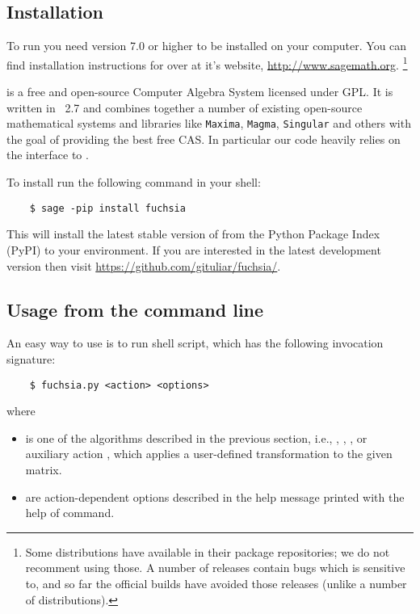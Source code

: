 \documentclass[12pt,a4paper]{article}
\begin{document}
\subsection{Installation}

To run \fuchsia you need \sage version 7.0 or higher to be installed on your computer.
You can find installation instructions for \sage over at it's website, \url{http://www.sagemath.org}.
\footnote{
    Some \linux distributions have \sage available in their package repositories; we do not recomment using those.
    A number of \maxima releases contain bugs which \fuchsia is sensitive to, and so far the official \sage builds have avoided those releases (unlike a number of \linux distributions).
}

\sage is a free and open-source Computer Algebra System licensed under GPL.
It is written in \python~2.7 and combines together a number of existing open-source mathematical systems and libraries like \texttt{Maxima}, \texttt{Magma}, \texttt{Singular} and others with the goal of providing the best free CAS.
In particular our code heavily relies on the interface to \maxima.

To install \fuchsia run the following command in your shell:

\begin{verbatim}
    $ sage -pip install fuchsia
\end{verbatim}

This will install the latest stable version of \fuchsia from the Python Package Index (PyPI) to your \sage environment.
If you are interested in the latest development version then visit \url{https://github.com/gituliar/fuchsia/}.

\subsection{Usage from the command line}

An easy way to use \fuchsia is to run  shell script, which has the following invocation signature:

\begin{verbatim}
    $ fuchsia.py <action> <options>
\end{verbatim}

where
\begin{itemize}
  \item {} is one of the algorithms described in the previous section, i.e., , , , or auxiliary action , which applies a user-defined transformation to the given matrix.
  \item {} are action-dependent options described in the help message printed with the help of  command.
\end{itemize}
\end{document}
